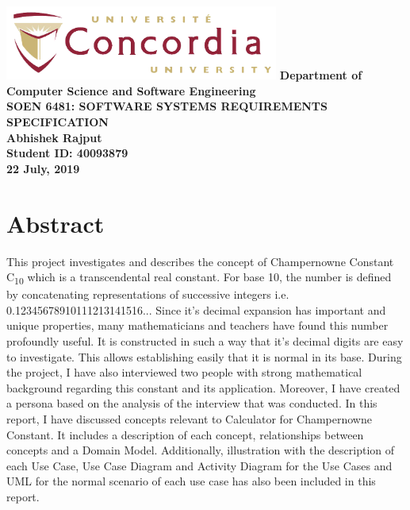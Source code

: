 \documentclass[paper=a4, fontsize=11pt]{report}
\numberwithin{equation}{section}		%
\numberwithin{figure}{section}			%
\numberwithin{table}{section}				%
\begin{document}
\begin{titlepage}
    \centering
    \vfill
    \includegraphics[width=9cm]{Concordia-University-logo.png}
    {\bfseries\Large
        \vskip2cm
        Department of Computer Science and Software Engineering \\
        \vskip2cm
        SOEN 6481: SOFTWARE SYSTEMS REQUIREMENTS SPECIFICATION\\
        \vskip2cm
        Abhishek Rajput\\
        Student ID: 40093879\\
        \vskip9mm
        22 July, 2019\\
    }    
    \vfill
    \vfill
    \vfill
\end{titlepage}

\tableofcontents

\chapter{Abstract}
This project investigates and describes the concept of Champernowne Constant C\textsubscript{10} which is a transcendental real constant. For base 10, the number is defined by concatenating representations of successive integers i.e. 0.12345678910111213141516...
\vskip1mm
Since it's decimal expansion has important and unique properties, many mathematicians and teachers have found this number profoundly useful. It is constructed in such a way that it's decimal digits are easy to investigate. This allows establishing easily that it is normal in its base.
\vskip1mm
During the project, I have also interviewed two people with strong mathematical background regarding this constant and its application. Moreover, I have created a persona based on the analysis of the interview that was conducted.
\vskip1mm
In this report, I have discussed concepts relevant to Calculator for Champernowne Constant. It includes a description of each concept, relationships between concepts and a Domain Model.
\vskip1mm
Additionally, illustration with the description of each Use Case, Use Case Diagram and Activity Diagram for the Use Cases and UML for the normal scenario of each use case has also been included in this report.
\end{document}
